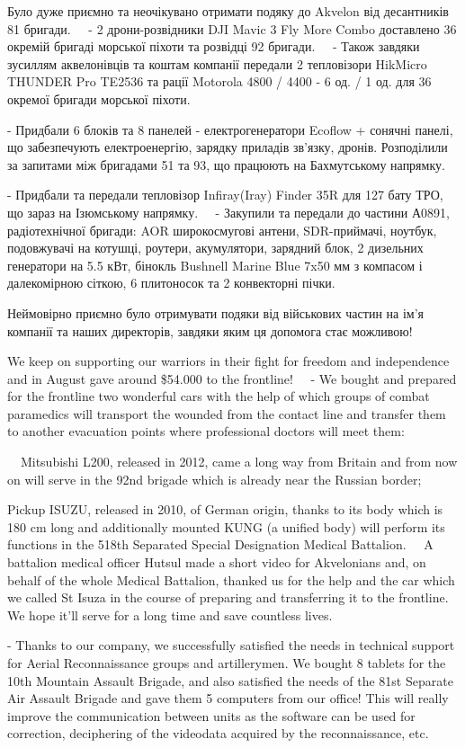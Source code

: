Було дуже приємно та неочікувано отримати подяку до Akvelon від десантників 81
бригади.
⠀
- 2 дрони-розвідники DJI Mavic 3 Fly More Combo доставлено 36 окремій бригаді
морської піхоти та розвідці 92 бригади.
⠀
- Також завдяки зусиллям аквелонівців та коштам компанії передали 2 тепловізори
HikMicro THUNDER Pro TE2536 та рації Motorola 4800 / 4400 - 6 од. / 1 од. для
36 окремої бригади морської піхоти.

- Придбали 6 блоків та 8 панелей - електрогенератори Ecoflow + сонячні панелі,
що забезпечують електроенергію, зарядку приладів зв'язку, дронів. Розподілили
за запитами між бригадами 51 та 93, що працюють на Бахмутському напрямку.  ⠀

- Придбали та передали тепловізор Infiray(Iray) Finder 35R для 127 бату ТРО, що
зараз на Ізюмському напрямку.
⠀
- Закупили та передали до частини А0891, радіотехнічної бригади: AOR
широкосмугові антени, SDR-приймачі, ноутбук, подовжувачі на котушці, роутери,
акумулятори, зарядний блок, 2 дизельних генератори на 5.5 кВт, бінокль Bushnell
Marine Blue 7x50 мм з компасом і далекомірною сіткою, 6 плитоносок та 2
конвекторні пічки.  ⠀

Неймовірно приємно було отримувати подяки від військових частин на ім'я
компанії та наших директорів, завдяки яким ця допомога стає можливою!


We keep on supporting our warriors in their fight for freedom and independence
and in August gave around \$54.000 to the frontline!
⠀
- We bought and prepared for the frontline two wonderful cars with the help of
which groups of combat paramedics will transport the wounded from the contact
line and transfer them to another evacuation points where professional doctors
will meet them:

⠀
Mitsubishi L200, released in 2012, came a long way from Britain and from now on
will serve in the 92nd brigade which is already near the Russian border;

Pickup ISUZU, released in 2010, of German origin, thanks to its body which is
180 cm long and additionally mounted KUNG (a unified body) will perform its
functions in the 518th Separated Special Designation Medical Battalion.
⠀
A battalion medical officer Hutsul made a short video for Akvelonians and, on
behalf of the whole Medical Battalion, thanked us for the help and the car
which we called St Isuza in the course of preparing and transferring it to the
frontline. We hope it’ll serve for a long time and save countless lives.  ⠀

- Thanks to our company, we successfully satisfied the needs in technical
support for Aerial Reconnaissance groups and artillerymen. We bought 8 tablets
for the 10th Mountain Assault Brigade, and also satisfied the needs of the 81st
Separate Air Assault Brigade and gave them 5 computers from our office! This
will really improve the communication between units as the software can be used
for correction, deciphering of the videodata acquired by the reconnaissance,
etc.

